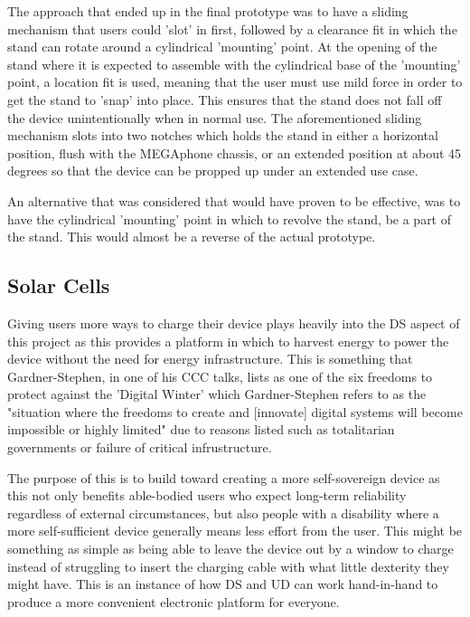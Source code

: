 The approach that ended up in the final prototype was to have a sliding mechanism that users could 'slot' in first, followed by a clearance fit in which the stand can rotate around a cylindrical 'mounting' point.  %
At the opening of the stand where it is expected to assemble with the cylindrical base of the 'mounting' point, a location fit is used, meaning that the user must use mild force in order to get the stand to 'snap' into place.
This ensures that the stand does not fall off the device unintentionally when in normal use.
The aforementioned sliding mechanism slots into two notches which holds the stand in either a horizontal position, flush with the MEGAphone chassis, or an extended position at about 45 degrees so that the device can be propped up under an extended use case.

An alternative that was considered that would have proven to be effective, was to have the cylindrical 'mounting' point in which to revolve the stand, be a part of the stand.
This would almost be a reverse of the actual prototype.

\subsection{Solar Cells} \label{Solar Cells}

Giving users more ways to charge their device plays heavily into the DS aspect of this project as this provides a platform in which to harvest energy to power the device without the need for energy infrastructure.
This is something that Gardner-Stephen, in one of his CCC talks, lists as one of the six freedoms to protect against the 'Digital Winter' which Gardner-Stephen refers to as the "situation where the freedoms to create and [innovate] digital systems will become impossible or highly limited" due to reasons listed such as totalitarian governments or failure of critical infrustructure\cite{freedoms}.

The purpose of this is to build toward creating a more self-sovereign device as this not only benefits able-bodied users who expect long-term reliability regardless of external circumstances, but also people with a disability where a more self-sufficient device generally means less effort from the user.
This might be something as simple as being able to leave the device out by a window to charge instead of struggling to insert the charging cable with what little dexterity they might have.
This is an instance of how DS and UD can work hand-in-hand to produce a more convenient electronic platform for everyone.

